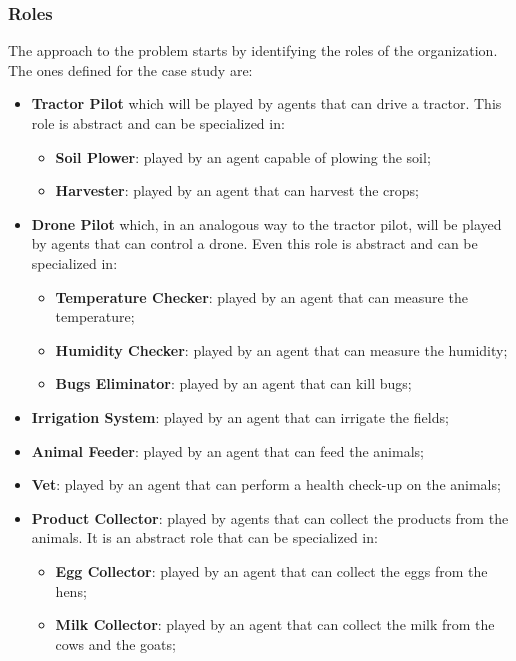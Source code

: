 \subsubsection{Roles}
The approach to the problem starts by identifying the roles of the organization.
The ones defined for the case study are:
\begin{itemize}
    \item \textbf{Tractor Pilot} which will be played by agents that can drive a tractor.
    This role is abstract and can be specialized in:
    \begin{itemize}
        \item \textbf{Soil Plower}: played by an agent capable of plowing the soil;
        \item \textbf{Harvester}: played by an agent that can harvest the crops;
    \end{itemize}
    \item \textbf{Drone Pilot} which, in an analogous way to the tractor pilot, will be played by agents that can control a drone.
    Even this role is abstract and can be specialized in:
    \begin{itemize}
        \item \textbf{Temperature Checker}: played by an agent that can measure the temperature;
        \item \textbf{Humidity Checker}: played by an agent that can measure the humidity;
        \item \textbf{Bugs Eliminator}: played by an agent that can kill bugs;
    \end{itemize}
    \item \textbf{Irrigation System}: played by an agent that can irrigate the fields;
    \item \textbf{Animal Feeder}: played by an agent that can feed the animals;
    \item \textbf{Vet}: played by an agent that can perform a health check-up on the animals;
    \item \textbf{Product Collector}: played by agents that can collect the products from the animals.
    It is an abstract role that can be specialized in:
    \begin{itemize}
        \item \textbf{Egg Collector}: played by an agent that can collect the eggs from the hens;
        \item \textbf{Milk Collector}: played by an agent that can collect the milk from the cows and the goats;
    \end{itemize}
\end{itemize}

